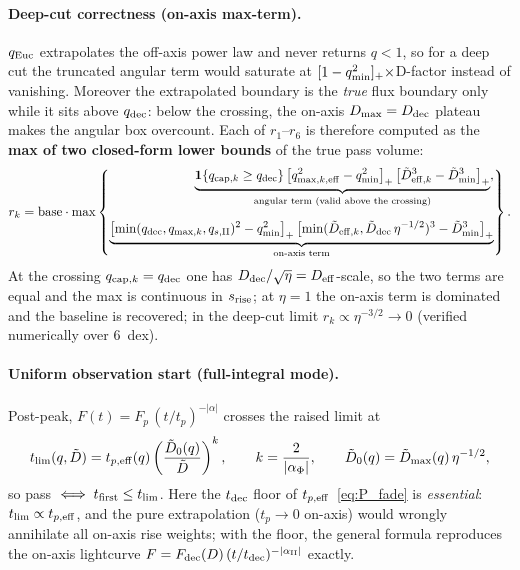 \documentclass[11pt,a4paper]{article}
\begin{document}
\paragraph{Deep-cut correctness (on-axis max-term).} $q_{\rm Euc}$ extrapolates the off-axis power law and never returns $q<1$, so for a deep cut the truncated angular term would saturate at $[1-q_{\rm min}^2]_+\times$D-factor instead of vanishing. Moreover the extrapolated boundary is the \emph{true} flux boundary only while it sits above $q_{\rm dec}$: below the crossing, the on-axis $D_{\rm max}=D_{\rm dec}$ plateau makes the angular box overcount. Each of $r_1$--$r_6$ is therefore computed as the \textbf{max of two closed-form lower bounds} of the true pass volume:
\[
r_k=\text{base}\cdot\max\left\{\begin{aligned}
\underbrace{\mathbf 1\{q_{{\rm cap},k}\ge q_{\rm dec}\}\,\bigl[q_{{\rm max},k,\rm eff}^2-q_{\rm min}^2\bigr]_+\,\bigl[\tilde D_{{\rm eff},k}^3-\tilde D_{\rm min}^3\bigr]_+}_{\text{angular term (valid above the crossing)}},\\[6pt]
\underbrace{\bigl[\min(q_{\rm dec},q_{{\rm max},k},q_{s,\rm II})^2-q_{\rm min}^2\bigr]_+\,\bigl[\min(\tilde D_{{\rm eff},k},\tilde D_{\rm dec}\,\eta^{-1/2})^3-\tilde D_{\rm min}^3\bigr]_+}_{\text{on-axis term}}
\end{aligned}\right\}.
\]
At the crossing $q_{{\rm cap},k}=q_{\rm dec}$ one has $D_{\rm dec}/\sqrt\eta=D_{\rm eff}$-scale, so the two terms are equal and the max is continuous in $s_{\rm rise}$; at $\eta=1$ the on-axis term is dominated and the baseline is recovered; in the deep-cut limit $r_k\propto\eta^{-3/2}\to 0$ (verified numerically over 6~dex).

\paragraph{Uniform observation start (full-integral mode).} Post-peak, $F(t)=F_p\,(t/t_p)^{-|\alpha|}$ crosses the raised limit at
\begin{equation}
\label{eq:t_lim}
t_{\rm lim}(q,\tilde D)=t_{p,\rm eff}(q)\left(\frac{\tilde D_0(q)}{\tilde D}\right)^{k},\qquad
k=\frac{2}{|\alpha_{\Phi}|},\qquad
\tilde D_0(q)=\tilde D_{\rm max}(q)\,\eta^{-1/2},
\end{equation}
so pass $\iff t_{\rm first}\le t_{\rm lim}$. Here the $t_{\rm dec}$ floor of $t_{p,\rm eff}$~\eqref{eq:P_fade} is \emph{essential}: $t_{\rm lim}\propto t_{p,\rm eff}$, and the pure extrapolation ($t_p\to 0$ on-axis) would wrongly annihilate all on-axis rise weights; with the floor, the general formula reproduces the on-axis lightcurve $F=F_{\rm dec}(D)\,(t/t_{\rm dec})^{-|\alpha_{\rm II}|}$ exactly.
\end{document}
